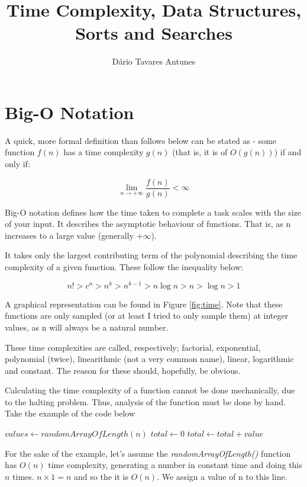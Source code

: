 \documentclass[]{article}
\title{Time Complexity, Data Structures, Sorts and Searches}
\author{D\'{a}rio Tavares Antunes}
\date{}
\newcommand{\numberLess}[1]{
\addcontentsline{toc}{section}{#1}
\section*{#1}
}
\begin{document}
	
\maketitle

\tableofcontents
\listoffigures

\pagebreak
{}

\numberLess{Big-O Notation}

A quick, more formal definition than follows below can be stated as - some function $f(n)$ has a time complexity $g(n)$ (that is, it is of $O(g(n))$) if and only if:

\[\lim_{n \to +\infty}\frac{f(n)}{g(n)} < \infty\]

Big-O notation defines how the time taken to complete a task scales with the size of your input. It describes the asymptotic behaviour of functions. That is, as n increases to a large value (generally $+\infty$).

It takes only the largest contributing term of the polynomial describing the time complexity of a given function. These follow the inequality below:

\[n! > c^{n} > n^{k} > n^{k-1} > n\log{n} > n > \log{n} > 1\]

A graphical representation can be found in Figure \ref{fig:time}. Note that these functions are only sampled (or at least I tried to only sample them) at integer values, as n will always be a natural number.

These time complexities are called, respectively; factorial, exponential, polynomial (twice), linearithmic (not a very common name), linear, logarithmic and constant. The reason for these should, hopefully, be obvious.

Calculating the time complexity of a function cannot be done mechanically, due to the halting problem. Thus, analysis of the function must be done by hand. Take the example of the code below

\begin{algorithmic}[1]
	\State $values \gets randomArrayOfLength(n)$
	\State $total \gets 0$
		\State $total \gets total + value$
	\EndFor
\end{algorithmic}

For the sake of the example, let's assume the \emph{randomArrayOfLength()} function has $O(n)$ time complexity, generating a number in constant time and doing this $n$ times. $n \times 1 = n$ and so the it is $O(n)$. We assign a value of n to this line.
\end{document}
